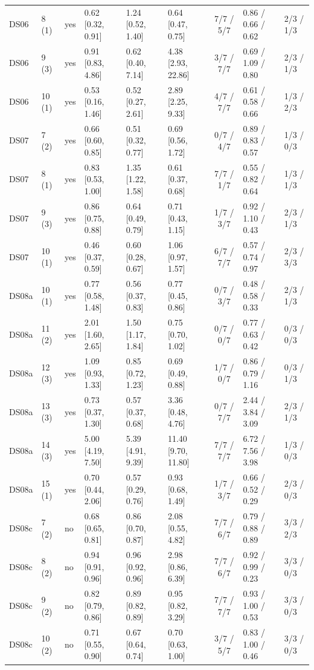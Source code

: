 \documentclass[10pt]{article}
\begin{document}
{\begin{longtable}{llllllcll}
DS06 & 8 (1) & yes & 0.62 [0.32, 0.91] & 1.24 [0.52, 1.40] & 0.64 [0.47, 0.75] & 7/7 / 5/7 & 0.86 / 0.66 / 0.62 & 2/3 / 1/3 \\
DS06 & 9 (3) & yes & 0.91 [0.83, 4.86] & 0.62 [0.40, 7.14] & 4.38 [2.93, 22.86] & 3/7 / 7/7 & 0.69 / 1.09 / 0.80 & 2/3 / 1/3 \\
DS06 & 10 (1) & yes & 0.53 [0.16, 1.46] & 0.52 [0.27, 2.61] & 2.89 [2.25, 9.33] & 4/7 / 7/7 & 0.61 / 0.58 / 0.66 & 1/3 / 2/3 \\
\midrule
DS07 & 7 (2) & yes & 0.66 [0.60, 0.85] & 0.51 [0.32, 0.77] & 0.69 [0.56, 1.72] & 0/7 / 4/7 & 0.89 / 0.83 / 0.57 & 1/3 / 0/3 \\
DS07 & 8 (1) & yes & 0.83 [0.53, 1.00] & 1.35 [1.22, 1.58] & 0.61 [0.37, 0.68] & 7/7 / 1/7 & 0.55 / 0.82 / 0.64 & 1/3 / 1/3 \\
DS07 & 9 (3) & yes & 0.86 [0.75, 0.88] & 0.64 [0.49, 0.79] & 0.71 [0.43, 1.15] & 1/7 / 3/7 & 0.92 / 1.10 / 0.43 & 2/3 / 1/3 \\
DS07 & 10 (1) & yes & 0.46 [0.37, 0.59] & 0.60 [0.28, 0.67] & 1.06 [0.97, 1.57] & 6/7 / 7/7 & 0.57 / 0.74 / 0.97 & 2/3 / 3/3 \\
\midrule
DS08a & 10 (1) & yes & 0.77 [0.58, 1.48] & 0.56 [0.37, 0.83] & 0.77 [0.45, 0.86] & 0/7 / 3/7 & 0.48 / 0.58 / 0.33 & 2/3 / 1/3 \\
DS08a & 11 (2) & yes & 2.01 [1.60, 2.65] & 1.50 [1.17, 1.84] & 0.75 [0.70, 1.02] & 0/7 / 0/7 & 0.77 / 0.63 / 0.42 & 0/3 / 0/3 \\
DS08a & 12 (3) & yes & 1.09 [0.93, 1.33] & 0.85 [0.72, 1.23] & 0.69 [0.49, 0.88] & 1/7 / 0/7 & 0.86 / 0.79 / 1.16 & 0/3 / 1/3 \\
DS08a & 13 (3) & yes & 0.73 [0.37, 1.30] & 0.57 [0.37, 0.68] & 3.36 [0.48, 4.76] & 0/7 / 7/7 & 2.44 / 3.84 / 3.09 & 2/3 / 1/3 \\
DS08a & 14 (3) & yes & 5.00 [4.19, 7.50] & 5.39 [4.91, 9.39] & 11.40 [9.70, 11.80] & 7/7 / 7/7 & 6.72 / 7.56 / 3.98 & 1/3 / 0/3 \\
DS08a & 15 (1) & yes & 0.70 [0.44, 2.06] & 0.57 [0.29, 0.76] & 0.93 [0.68, 1.49] & 1/7 / 3/7 & 0.66 / 0.52 / 0.29 & 2/3 / 0/3 \\
\midrule
DS08c & 7 (2) & no & 0.68 [0.65, 0.81] & 0.86 [0.70, 0.87] & 2.08 [0.55, 4.82] & 7/7 / 6/7 & 0.79 / 0.88 / 0.89 & 3/3 / 2/3 \\
DS08c & 8 (2) & no & 0.94 [0.91, 0.96] & 0.96 [0.92, 0.96] & 2.98 [0.86, 6.39] & 7/7 / 6/7 & 0.92 / 0.99 / 0.23 & 3/3 / 0/3 \\
DS08c & 9 (2) & no & 0.82 [0.79, 0.86] & 0.89 [0.82, 0.89] & 0.95 [0.82, 3.29] & 7/7 / 7/7 & 0.93 / 1.00 / 0.53 & 3/3 / 0/3 \\
DS08c & 10 (2) & no & 0.71 [0.55, 0.90] & 0.67 [0.64, 0.74] & 0.70 [0.63, 1.00] & 3/7 / 5/7 & 0.83 / 1.00 / 0.46 & 3/3 / 0/3 \\
\end{longtable}
\vspace{-0.6em}
}
\end{document}
